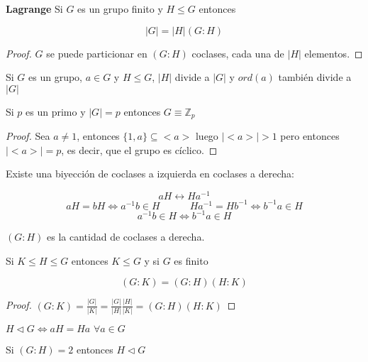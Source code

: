 \begin{teo}{\bf Lagrange}
Si $G$ es un grupo finito y $H \leq G$ entonces

$$|G| = |H| (G : H)$$
\end{teo}

\begin{proof}
$G$ se puede particionar en $(G:H)$ coclases, cada una de $|H|$ elementos.
\end{proof}

\begin{cor}
Si $G$ es un grupo, $a \in G$ y $H \leq G$, $|H|$ divide a $|G|$ y $ord(a)$ tambi\'en divide a $|G|$
\end{cor}

\begin{obs}
Si $p$ es un primo y $|G| = p$ entonces $G \equiv \mathbb{Z}_p$
\end{obs}

\begin{proof}
Sea $a \neq 1$, entonces $\{1,a\} \subseteq <a>$ luego $|<a>| > 1$ pero entonces $|<a>| = p$, es decir, que el grupo es c\'iclico.
\end{proof}

\begin{obs}
Existe una biyecci\'on de coclases a izquierda en coclases a derecha:

$$aH \leftrightarrow Ha^{-1}$$
$$aH = bH \Leftrightarrow a^{-1}b \in H \quad\quad\quad Ha^{-1} = Hb^{-1} \Leftrightarrow b^{-1}a \in H$$
$$a^{-1}b \in H \Leftrightarrow b^{-1}a \in H$$
\end{obs}

\begin{cor}
$(G:H)$ es la cantidad de coclases a derecha.
\end{cor}

\begin{prop}
Si $K \leq H \leq G$ entonces $K \leq G$ y si $G$ es finito

$$(G : K) = (G : H) (H : K)$$
\end{prop}

\begin{proof}
$(G : K) = \frac{|G|}{|K|} = \frac{|G|}{|H|} \frac{|H|}{|K|} = (G : H) (H : K)$
\end{proof}

\begin{obs}
$H \triangleleft G \Leftrightarrow aH = Ha \,\, \forall a \in G$
\end{obs}

\begin{prop}
Si $(G:H) = 2$ entonces $H \triangleleft G$
\end{prop}


